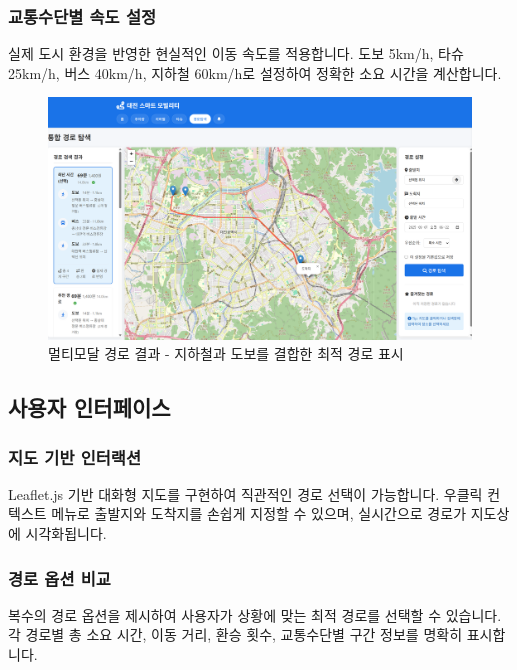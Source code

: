 \subsubsection{교통수단별 속도 설정}
실제 도시 환경을 반영한 현실적인 이동 속도를 적용합니다. 도보 5km/h, 타슈 25km/h, 버스 40km/h, 지하철 60km/h로 설정하여 정확한 소요 시간을 계산합니다.

\begin{figure}[h]
    \includegraphics[width=\columnwidth]{2/daejeon-3.png}
    \caption{멀티모달 경로 결과 - 지하철과 도보를 결합한 최적 경로 표시}
    \label{fig:multimodal_route}
\end{figure}

\subsection{사용자 인터페이스}

\subsubsection{지도 기반 인터랙션}
Leaflet.js 기반 대화형 지도를 구현하여 직관적인 경로 선택이 가능합니다. 우클릭 컨텍스트 메뉴로 출발지와 도착지를 손쉽게 지정할 수 있으며, 실시간으로 경로가 지도상에 시각화됩니다.

\subsubsection{경로 옵션 비교}
복수의 경로 옵션을 제시하여 사용자가 상황에 맞는 최적 경로를 선택할 수 있습니다. 각 경로별 총 소요 시간, 이동 거리, 환승 횟수, 교통수단별 구간 정보를 명확히 표시합니다.

